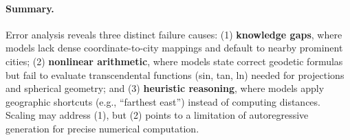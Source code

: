 \paragraph{Summary.}
Error analysis reveals three distinct failure causes: (1) \textbf{knowledge gaps}, where models lack dense coordinate-to-city mappings and default to nearby prominent cities; (2) \textbf{nonlinear arithmetic}, where models state correct geodetic formulas but fail to evaluate transcendental functions (sin, tan, ln) needed for projections and spherical geometry; and (3) \textbf{heuristic reasoning}, where models apply geographic shortcuts (e.g., ``farthest east'') instead of computing distances. Scaling may address (1), but (2) points to a limitation of autoregressive generation for precise numerical computation.
